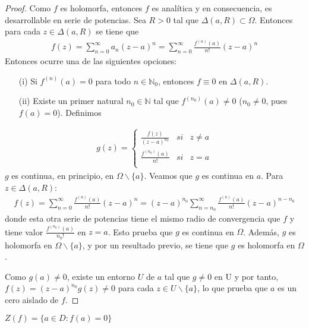 \begin{proof}
    Como $f$ es holomorfa, entonces $f$ es analítica y en consecuencia, es desarrollable en serie de potencias. Sea $R > 0$ tal que $\Delta(a,R) \subset \Omega$. Entonces para cada $z \in \Delta(a,R)$ se tiene que
    \begin{align*}
        f(z) = \sum_{n=0}^{\infty}{a_n (z-a)^n} = \sum_{n=0}^{\infty}{\frac{f^{(n)}(a)}{n!} (z-a)^n}
    \end{align*}
    Entonces ocurre una de las siguientes opciones:
    \begin{enumerate}
        \item[(i)] Si $f^{(n)}(a) = 0$ para todo $n \in \mathbb{N}_0$, entonces $f \equiv 0$ en $\Delta(a,R)$.
        \item[(ii)] Existe un primer natural $n_0 \in \mathbb{N}$ tal que $f^{(n_0)}(a) \not = 0$ ($n_0 \not = 0$, pues $f(a) = 0$). Definimos
    \end{enumerate}
    \begin{align*}
        g(z) = \left\{ \begin{array}{lcc}
                           \frac{f(z)}{(z-a)^{n_0}} & si & z \not = a \\
                           \frac{f^{(n_0)}(a)}{n!}  & si & z = a      \\
                       \end{array}
        \right.
    \end{align*}
    $g$ es continua, en principio, en $\Omega \backslash \{a\}$. Veamos que $g$ es continua en $a$. Para $z \in \Delta(a,R)$:
    \begin{align*}
        f(z) = \sum_{n=0}^{\infty}{\frac{f^{(n)}(a)}{n!} (z-a)^n} = (z-a)^{n_0}\sum_{n=n_0}^{\infty}{\frac{f^{(n)}(a)}{n!} (z-a)^{n-n_0}}
    \end{align*}
    donde esta otra serie de potencias tiene el mismo radio de convergencia que $f$ y tiene valor $\frac{f^{(n_0)}(a)}{n_0!}$ en $z = a$. Esto prueba que $g$ es continua en $\Omega$. Además, $g$ es holomorfa en $\Omega \backslash \{a\}$, y por un resultado previo, se tiene que $g$ es holomorfa en $\Omega$.

    Como $g(a) \not = 0$, existe un entorno $U$ de $a$ tal que $g \not = 0$ en U y por tanto, $f(z) = (z-a)^{n_0}g(z) \not = 0$ para cada $z \in U \backslash \{a\}$, lo que prueba que $a$ es un cero aislado de $f$.
\end{proof}

\begin{defi}
    $Z(f) = \{ a \in D : f(a) = 0\}$
\end{defi}

